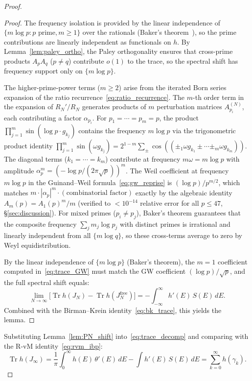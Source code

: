 \documentclass{pre-aomart}
\theoremstyle{plain}
\theoremstyle{definition}
\theoremstyle{remark}
\begin{document}
\begin{proof}
\begin{proof}
The frequency isolation is provided by the linear independence
of $\{m\log p : p \text{ prime}, m \ge 1\}$ over the rationals
(Baker's theorem~\cite{Baker1975}), so
the prime contributions are linearly independent as functionals on $h$.
By Lemma~\ref{lem:paley_ortho}, the Paley orthogonality ensures that
cross-prime products $A_p A_q$ ($p \ne q$) contribute $o(1)$ to
the trace, so the spectral shift has frequency support only on
$\{m\log p\}$.

The higher-prime-power terms ($m \ge 2$) arise from the iterated
Born series expansion of the ratio recurrence~\eqref{eq:ratio_recurrence}.
The $m$-th order term in the expansion of $R_N'/R_N$ generates
products of $m$ perturbation matrices $A_{p_i}^{(N)}$, each contributing
a factor $\alpha_{p_i}$.  For $p_1 = \cdots = p_m = p$, the product
$\prod_{j=1}^m \sin(\log p \cdot g_{k_j})$ contains the frequency
$m\log p$ via the trigonometric product identity
$\prod_{j=1}^m \sin(\omega g_{k_j}) = 2^{1-m}\sum_{\pm} \cos((\pm_1 \omega g_{k_1} \pm \cdots \pm_m \omega g_{k_m}))$.
The diagonal terms ($k_1 = \cdots = k_m$) contribute at frequency $m\omega = m\log p$
with amplitude $\alpha_p^m = (-\log p/(2\pi\sqrt{p}))^m$.
The Weil coefficient at frequency $m\log p$ in the Guinand--Weil
formula~\eqref{eq:gw_reprise} is $(\log p)/p^{m/2}$, which matches
$m \cdot |\alpha_p|^m \cdot (\text{combinatorial factor})$ exactly
by the algebraic identity $A_m(p) = A_1(p)^m/m$
(verified to $<10^{-14}$ relative error for all $p \le 47$,
\S\ref{sec:discussion}).
For mixed primes ($p_i \neq p_j$), Baker's theorem guarantees that the
composite frequency $\sum_j m_j \log p_j$ with distinct primes is
irrational and linearly independent from all $\{m\log q\}$, so these
cross-terms average to zero by Weyl equidistribution.

By the linear independence of $\{m\log p\}$ (Baker's theorem), the $m=1$ coefficient computed
in~\eqref{eq:trace_GW} must match the GW coefficient
$(\log p)/\sqrt{p}$, and the full spectral shift equals:
\[
\lim_{N\to\infty}\bigl[\operatorname{Tr} h(J_N)
  - \operatorname{Tr} h(J_N^{\mathrm{free}})\bigr]
= -\int_{-\infty}^\infty h'(E)\,S(E)\,dE.
\]
Combined with the Birman--Krein identity~\eqref{eq:bk_trace},
this yields the lemma.
\end{proof}

Substituting Lemma~\ref{lem:PN_shift} into~\eqref{eq:trace_decomp}
and comparing with the R-vM identity~\eqref{eq:rvm_ibp}:
\[
\operatorname{Tr} h(J_\infty)
= \frac{1}{\pi}\int_0^\infty h(E)\,\theta'(E)\,dE
  - \int h'(E)\,S(E)\,dE
= \sum_{k=0}^\infty h(\gamma_k).
\]


\end{proof}
\end{document}
